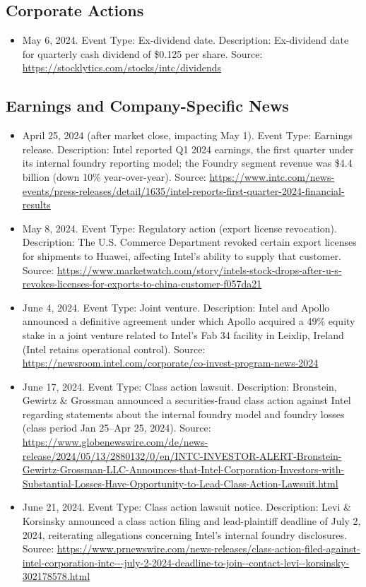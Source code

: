 \documentclass[10pt,a4paper,oneside]{article}
\begin{document}
\subsection{Corporate Actions}

\begin{itemize}
    \item May 6, 2024. Event Type: Ex-dividend date. Description: Ex-dividend date for quarterly cash dividend of \$0.125 per share. Source: \url{https://stocklytics.com/stocks/intc/dividends}
\end{itemize}

\subsection{Earnings and Company-Specific News}

\begin{itemize}
    \item April 25, 2024 (after market close, impacting May 1). Event Type: Earnings release. Description: Intel reported Q1 2024 earnings, the first quarter under its internal foundry reporting model; the Foundry segment revenue was \$4.4 billion (down 10\% year-over-year). Source: \url{https://www.intc.com/news-events/press-releases/detail/1635/intel-reports-first-quarter-2024-financial-results}
    \item May 8, 2024. Event Type: Regulatory action (export license revocation). Description: The U.S. Commerce Department revoked certain export licenses for shipments to Huawei, affecting Intel's ability to supply that customer. Source: \url{https://www.marketwatch.com/story/intels-stock-drops-after-u-s-revokes-licenses-for-exports-to-china-customer-f057da21}
    \item June 4, 2024. Event Type: Joint venture. Description: Intel and Apollo announced a definitive agreement under which Apollo acquired a 49\% equity stake in a joint venture related to Intel's Fab 34 facility in Leixlip, Ireland (Intel retains operational control). Source: \url{https://newsroom.intel.com/corporate/co-invest-program-news-2024}
    \item June 17, 2024. Event Type: Class action lawsuit. Description: Bronstein, Gewirtz \& Grossman announced a securities-fraud class action against Intel regarding statements about the internal foundry model and foundry losses (class period Jan 25--Apr 25, 2024). Source: \url{https://www.globenewswire.com/de/news-release/2024/05/13/2880132/0/en/INTC-INVESTOR-ALERT-Bronstein-Gewirtz-Grossman-LLC-Announces-that-Intel-Corporation-Investors-with-Substantial-Losses-Have-Opportunity-to-Lead-Class-Action-Lawsuit.html}
    \item June 21, 2024. Event Type: Class action lawsuit notice. Description: Levi \& Korsinsky announced a class action filing and lead-plaintiff deadline of July 2, 2024, reiterating allegations concerning Intel's internal foundry disclosures. Source: \url{https://www.prnewswire.com/news-releases/class-action-filed-against-intel-corporation-intc---july-2-2024-deadline-to-join--contact-levi--korsinsky-302178578.html}
\end{itemize}
\end{document}
